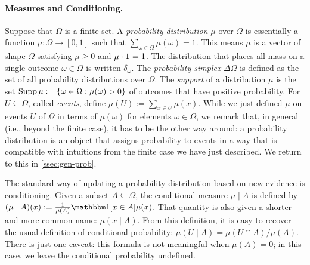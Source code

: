 \paragraph{Measures and Conditioning.}
Suppose that $\Omega$ is a finite set. 
A \emph{probability distribution} $\mu$ over $\Omega$ is essentially a function 
$\mu : \Omega \to [0,1]$ such that $\sum_{\omega \in \Omega} \mu(\omega) = 1$.
This means $\mu$ is a vector of shape 
$\Omega$ 
satisfying $\mu \ge 0$ and $\mu \cdot \mathbf 1 = 1$. 
%
The distribution that places all mass on a single outcome $\omega \in \Omega$ is written $\delta_\omega$. 
The \emph{probability simplex} $\Delta \Omega$ is defined as the set of all probability distributions over $\Omega$. 
The \emph{support} of a distribution $\mu$
    is the set $\operatorname{\mathrm{Supp}} \mu := \{ \omega \in \Omega : \mu(\omega) > 0 \}$
    of outcomes that have positive probability.
For $U \subseteq \Omega$, called \emph{events},
    define $\mu(U) := \sum_{x \in U} \mu(x)$. 
While we just defined $\mu$ on events $U$ of $\Omega$ in terms of $\mu(\omega)$ for elements $\omega \in \Omega$, we remark that, in general (i.e., beyond the finite case), it has to be the other way around: 
a probability distribution is an object that assigns probability to events in a way that is compatible with intuitions from the finite case we have just described.
We return to this in \cref{ssec:gen-prob}.


The standard way of updating a probability distribution based on new evidence is conditioning.
Given a subset $A \subseteq \Omega$, the conditional measure
$\mu \mid A$ is defined by
$(\mu \mid A)(x) := \frac{1}{\mu(A)} \mathbbm 1[x \in A] \mu(x)$.
That quantity is also given a shorter and more common name: $\mu(x \mid A)$. 
From this definition, it is easy to recover the usual definition of conditional probability:
$\mu(U \mid A) = \mu(U \cap A) / \mu(A)$. 
There is just one caveat: this formula is not meaningful when $\mu(A) = 0$; in this case, we leave the conditional probability undefined.
%


